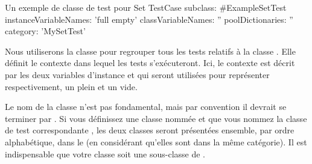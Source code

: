 \documentclass[a4paper,10pt,twoside]{book}
\begin{document}
\newpage{}
\begin{classdef}[exampleSetTest]{Un exemple de classe de test pour Set}
TestCase subclass: #ExampleSetTest
	instanceVariableNames: 'full empty'
	classVariableNames: ''
  poolDictionaries: ''
	category: 'MySetTest'
\end{classdef}
% 

Nous utiliserons la classe  pour regrouper tous les tests relatifs
à la classe . Elle définit le contexte dans lequel les tests s'exécuteront. Ici, 
le contexte est décrit par les deux variables d'instance  et  qui 
seront utilisées pour représenter respectivement, un  plein et un  vide.

Le nom de la classe n'est pas fondamental, mais par convention il devrait se terminer par .
Si vous définissez une classe nommée  et que vous nommez la classe de test 
correspondante , les deux classes seront présentées ensemble, par ordre 
alphabétique, dans le  (en considérant qu'elles sont dans la même catégorie). 
Il est indispensable que votre classe soit une sous-classe de .

\end{document}
